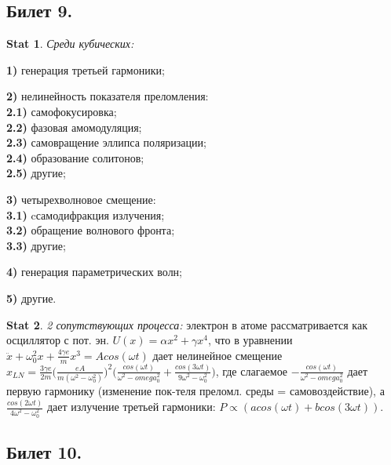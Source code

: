 \documentclass[a4paper,12pt]{article}
\theoremstyle{definition} %
\newtheorem{Stat}{Stat}[section]
\theoremstyle{definition} %
\theoremstyle{remark} %
\begin{document}
\subsection{Билет 9.}

\begin{Stat}\label{stat \theStat}
	\textit{Среди кубических:}\\
	\par \textbf{1)} генерация третьей гармоники; \\
	\par \textbf{2)} нелинейность показателя преломления: \\
	 \textbf{2.1)} самофокусировка; \\
	 \textbf{2.2)} фазовая амомодуляция; \\
 	 \textbf{2.3)} самовращение эллипса поляризации; \\
	 \textbf{2.4)} образование солитонов; \\
	 \textbf{2.5)} другие; \\
	\par \textbf{3)} четырехволновое смещение: \\
	 \textbf{3.1)} cсамодифракция излучения; \\
	 \textbf{3.2)} обращение волнового фронта; \\
	 \textbf{3.3)} другие; \\
	\par \textbf{4)} генерация параметрических волн; \\
	\par \textbf{5)} другие.
\end{Stat}
\begin{Stat}\label{stat \theStat}
	\textit{2 сопутствующих процесса:} электрон в атоме рассматривается как осциллятор с пот. эн. $U(x)=\alpha x^{2} + \gamma x^{4}$, что в уравнении $\ddot{x} + \omega_{0}^{2} x + \frac{4\gamma e}{m} x^{3} = Acos(\omega t)$ дает нелинейное смещение $x_{LN} = \frac{3\gamma e}{2m} \Big( \frac{eA}{m(\omega^{2}-\omega_{0}^{2})} \Big)^{2} \Big( \frac{cos(\omega t)}{\omega^{2}-omega_{0}^{2}} + \frac{cos(3\omega t)}{9\omega^{2}-\omega_{0}^{2}} \Big)$, где слагаемое $-\frac{cos(\omega t)}{\omega^{2}-omega_{0}^{2}}$ дает первую гармонику (изменение пок-теля преломл. среды = самовоздействие), а $\frac{cos(2\omega t)}{4\omega^{2}-\omega_{0}^{2}}$ дает излучение третьей гармоники: $P \propto (acos(\omega t)+bcos(3\omega t))$.
\end{Stat}

\subsection{Билет 10.}
\end{document}
